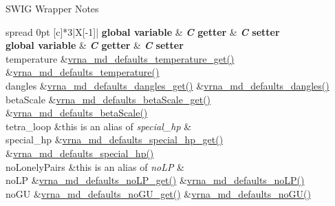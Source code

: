 \begin{DoxyRefDesc}{S\+W\+I\+G Wrapper Notes}
\tabulinesep=1mm
\begin{longtabu} spread 0pt [c]{*{3}{|X[-1]}|}
\hline
\rowcolor{\tableheadbgcolor}\textbf{ global variable  }&\textbf{ {\itshape C} getter  }&\textbf{ {\itshape C} setter   }\\
\endfirsthead
\hline
\endfoot
\hline
\rowcolor{\tableheadbgcolor}\textbf{ global variable  }&\textbf{ {\itshape C} getter  }&\textbf{ {\itshape C} setter   }\\
\endhead
temperature  &\mbox{\hyperlink{group__model__details_ga96b24a74437f9ba46c4e06343155bf46}{vrna\+\_\+md\+\_\+defaults\+\_\+temperature\+\_\+get()}}  &\mbox{\hyperlink{group__model__details_gaf9e527e9a2f7e6fd6e42bc6e602f5445}{vrna\+\_\+md\+\_\+defaults\+\_\+temperature()}}   \\
dangles  &\mbox{\hyperlink{group__model__details_ga67ca06f95ae133778c79a4493c9817b8}{vrna\+\_\+md\+\_\+defaults\+\_\+dangles\+\_\+get()}}  &\mbox{\hyperlink{group__model__details_gac76a5374def8e5e4e644ff6e4cc72dee}{vrna\+\_\+md\+\_\+defaults\+\_\+dangles()}}   \\
beta\+Scale  &\mbox{\hyperlink{group__model__details_gabb8780f5410c52f970d75b044059bd09}{vrna\+\_\+md\+\_\+defaults\+\_\+beta\+Scale\+\_\+get()}}  &\mbox{\hyperlink{group__model__details_gae984567db36c3f9b8731ecc917abf3a2}{vrna\+\_\+md\+\_\+defaults\+\_\+beta\+Scale()}}   \\
tetra\+\_\+loop  &this is an alias of {\itshape special\+\_\+hp}  &\\
special\+\_\+hp  &\mbox{\hyperlink{group__model__details_ga1d68a6efdaa1253cc63fd9cd06452559}{vrna\+\_\+md\+\_\+defaults\+\_\+special\+\_\+hp\+\_\+get()}}  &\mbox{\hyperlink{group__model__details_gafff6449a02744add0308e653230c15fc}{vrna\+\_\+md\+\_\+defaults\+\_\+special\+\_\+hp()}}   \\
no\+Lonely\+Pairs  &this is an alias of {\itshape no\+LP}  &\\
no\+LP  &\mbox{\hyperlink{group__model__details_ga934344888fbacaed538bbbfe910f2aa6}{vrna\+\_\+md\+\_\+defaults\+\_\+no\+L\+P\+\_\+get()}}  &\mbox{\hyperlink{group__model__details_ga2f88ffc393ac9d7987849c965fd29ea8}{vrna\+\_\+md\+\_\+defaults\+\_\+no\+L\+P()}}   \\
no\+GU  &\mbox{\hyperlink{group__model__details_ga5faa7d4e536d7fe36ec25428c0cf2563}{vrna\+\_\+md\+\_\+defaults\+\_\+no\+G\+U\+\_\+get()}}  &\mbox{\hyperlink{group__model__details_ga98218f85c7a957a1d1ddf4627fdf5a39}{vrna\+\_\+md\+\_\+defaults\+\_\+no\+G\+U()}}   \\

\end{longtabu}
\end{DoxyRefDesc}
